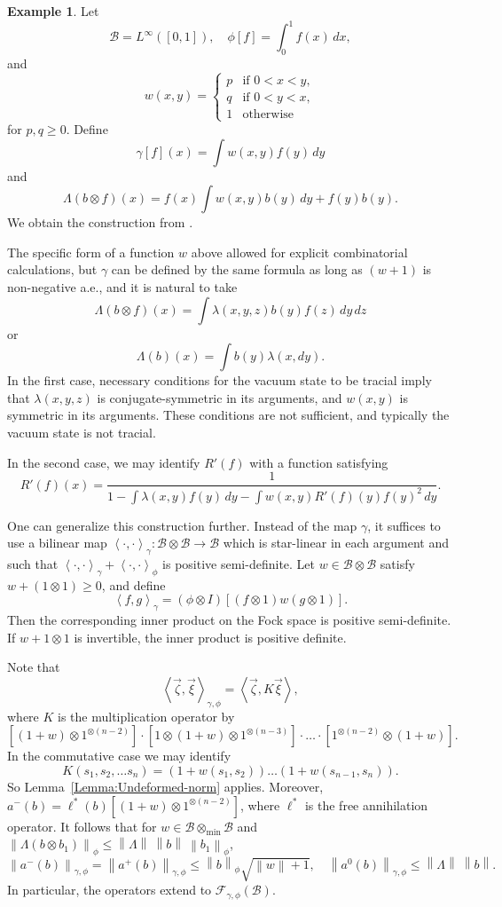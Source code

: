 \documentclass[12pt]{amsart}
\theoremstyle{definition}
\newtheorem{Example}[Thm]{Example}
\newcommand{\mc}[1]{\mathcal{#1}}
\newcommand{\ip}[2]{\left \langle{#1},{#2} \right \rangle}
\newcommand{\norm}[1]{\left \|{#1} \right \|}
\begin{document}
\begin{Example}
\label{Example:Lenczewski}
Let
\[
\mc{B} = L^\infty([0,1]), \quad \phi[f] = \int_0^1 f(x) \,dx,
\]
and
\[
w(x, y) =
\begin{cases}
p & \text{if } 0 < x < y, \\
q & \text{if } 0 < y < x, \\
1 & \text{otherwise}
\end{cases}
\]
for $p,q \geq 0$. Define
\[
\gamma[f](x) = \int w(x,y) f(y) \,dy
\]
and
\[
\Lambda(b \otimes f)(x) = f(x) \int w(x,y) b(y) \,dy + f(y) b(y).
\]
We obtain the construction from \cite{Lenczewski-Salapata-Kesten}.

The specific form of a function $w$ above allowed for explicit combinatorial calculations, but $\gamma$ can be defined by the same formula as long as $(w + 1)$ is non-negative a.e., and it is natural to take
\[
\Lambda(b \otimes f)(x) = \int \lambda(x, y, z) b(y) f(z) \,dy \,dz
\]
or
\[
\Lambda(b)(x) = \int b(y) \lambda(x, dy).
\]
In the first case, necessary conditions for the vacuum state to be tracial imply that $\lambda(x, y, z)$ is conjugate-symmetric in its arguments, and $w(x,y)$ is symmetric in its arguments. These conditions are not sufficient, and typically the vacuum state is not tracial.

In the second case, we may identify $R'(f)$ with a function satisfying
\[
R'(f)(x) = \frac{1}{1 - \int \lambda(x, y) f(y) \,dy - \int w(x,y) R'(f)(y) f(y)^2 \,dy}.
\]


One can generalize this construction further. Instead of the map $\gamma$, it suffices to use a bilinear map $\ip{\cdot}{\cdot}_\gamma: \mc{B} \otimes \mc{B} \rightarrow \mc{B}$ which is star-linear in each argument and such that $\ip{\cdot}{\cdot}_\gamma + \ip{\cdot}{\cdot}_\phi$ is positive semi-definite. Let $w \in \mc{B} \otimes \mc{B}$ satisfy $w + (1 \otimes 1) \geq 0$, and define
\[
\ip{f}{g}_\gamma = (\phi \otimes I)[(f \otimes 1) w (g \otimes 1)].
\]
Then the corresponding inner product on the Fock space is positive semi-definite. If $w + 1 \otimes 1$ is invertible, the inner product is positive definite.

Note that
\[
\ip{\vec{\zeta}}{\vec{\xi}}_{\gamma, \phi} = \ip{\vec{\zeta}}{K \vec{\xi}},
\]
where $K$ is the multiplication operator by
\[
[(1 + w) \otimes 1^{\otimes (n-2)}] \cdot [1 \otimes (1 + w) \otimes 1^{\otimes (n-3)}] \cdot \ldots \cdot [1^{\otimes (n-2)} \otimes (1 + w)].
\]
In the commutative case we may identify
\[
K(s_1, s_2, \ldots s_n) = (1 + w(s_1, s_2)) \ldots (1 + w(s_{n-1}, s_n)).
\]
So Lemma~\ref{Lemma:Undeformed-norm} applies. Moreover, $a^-(b) = \ell^\ast(b) [(1 + w) \otimes 1^{\otimes (n-2)}]$, where $\ell^\ast$ is the free annihilation operator. It follows that for $w \in \mc{B} \otimes_{\min} \mc{B}$ and $\norm{\Lambda(b \otimes b_1)}_\phi \leq \norm{\Lambda} \ \norm{b} \ \norm{b_1}_\phi$,
\[
\norm{a^-(b)}_{\gamma, \phi} = \norm{a^+(b)}_{\gamma, \phi} \leq \norm{b}_\phi \sqrt{\norm{w} + 1}, \quad \norm{a^0(b)}_{\gamma, \phi} \leq \norm{\Lambda} \ \norm{b}.
\]
In particular, the operators extend to $\mc{F}_{\gamma, \phi}(\mc{B})$.
\end{Example}
\end{document}
